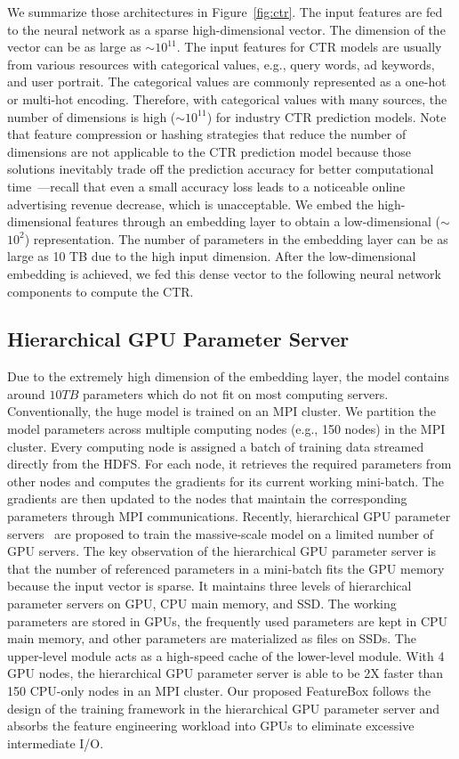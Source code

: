 \documentclass[conference]{IEEEtran}
\begin{document}
We summarize those architectures in Figure~\ref{fig:ctr}. The input features are fed to the neural network as a sparse high-dimensional vector. The dimension of the vector can be as large as $\sim$$10^{11}$. The input features for CTR models are usually from various resources with categorical values, e.g., query words, ad keywords, and user portrait. The categorical values are commonly represented as a one-hot or multi-hot encoding. Therefore, with categorical values with many sources, the number of dimensions is high ($\sim$$10^{11}$) for industry CTR prediction models. Note that feature compression or hashing strategies that reduce the number of dimensions are not applicable to the CTR prediction model because those solutions inevitably trade off the prediction accuracy for better computational time~\cite{deng2021deeplight}---recall that even a small accuracy loss leads to a noticeable online advertising revenue decrease, which is unacceptable. We embed the high-dimensional features through an embedding layer to obtain a low-dimensional ($\sim$$10^2$) representation. The number of parameters in the embedding layer can be as large as 10 TB due to the high input dimension. After the low-dimensional embedding is achieved, we fed this dense vector to the following neural network components to compute the CTR. 

\subsection{Hierarchical GPU Parameter Server}
Due to the extremely high dimension of the embedding layer, the model contains around $10 TB$ parameters which do not fit on most computing servers. Conventionally, the huge model is trained on an MPI cluster. We partition the model parameters across multiple computing nodes (e.g., 150 nodes) in the MPI cluster. Every computing node is assigned a batch of training data streamed directly from the HDFS. 
For each node, it retrieves the required parameters from other nodes and computes the gradients for its current working mini-batch. The gradients are then updated to the nodes that maintain the corresponding parameters through MPI communications. Recently, hierarchical GPU parameter servers~\cite{Proc:Zhao_MLSys20} are proposed to train the massive-scale model on a limited number of GPU servers. The key observation of the hierarchical GPU parameter server is that the number of referenced parameters in a mini-batch fits the GPU memory because the input vector is sparse. It maintains three levels of hierarchical parameter servers on GPU, CPU main memory, and SSD. The working parameters are stored in GPUs, the frequently used parameters are kept in CPU main memory, and other parameters are materialized as files on SSDs. The upper-level module acts as a high-speed cache of the lower-level module. With 4 GPU nodes, the hierarchical GPU parameter server is able to be 2X faster than 150 CPU-only nodes in an MPI cluster. Our proposed FeatureBox follows the design of the training framework in the hierarchical GPU parameter server and absorbs the feature engineering workload into GPUs to eliminate excessive intermediate I/O.
\end{document}

